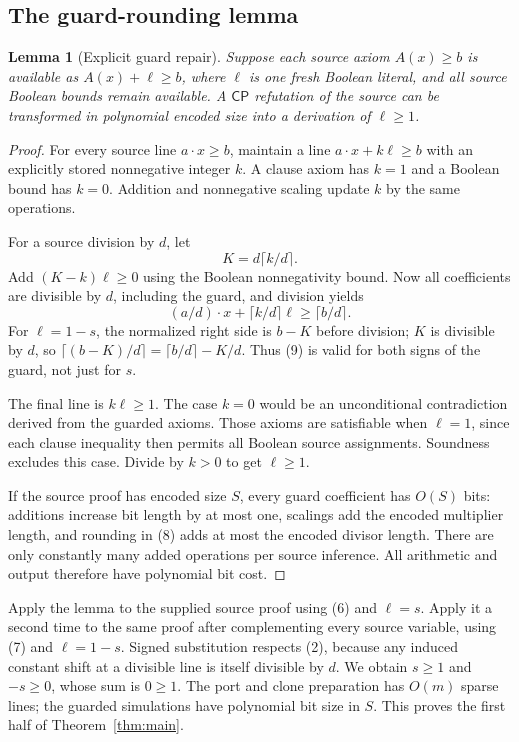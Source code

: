 \documentclass[11pt]{article}
\newtheorem{lemma}[theorem]{Lemma}
\newcommand{\CP}{\mathsf{CP}}
\begin{document}
\subsection{The guard-rounding lemma}
\begin{lemma}[Explicit guard repair]\label{lem:guard}
Suppose each source axiom $A(x)\ge b$ is available as $A(x)+\ell\ge b$,
where $\ell$ is one fresh Boolean literal, and all source Boolean bounds
remain available. A $\CP$ refutation of the source can be transformed in
polynomial encoded size into a derivation of $\ell\ge1$.
\end{lemma}
\begin{proof}
For every source line $a\cdot x\ge b$, maintain a line
$a\cdot x+k\ell\ge b$ with an explicitly stored nonnegative integer $k$.
A clause axiom has $k=1$ and a Boolean bound has $k=0$. Addition and
nonnegative scaling update $k$ by the same operations.

For a source division by $d$, let
\[
            K=d\lceil k/d\rceil.                                    \tag{8}
\]
Add $(K-k)\ell\ge0$ using the Boolean nonnegativity bound. Now all
coefficients are divisible by $d$, including the guard, and division yields
\[
        (a/d)\cdot x+\lceil k/d\rceil\ell\ge\lceil b/d\rceil.         \tag{9}
\]
For $\ell=1-s$, the normalized right side is $b-K$ before division;
$K$ is divisible by $d$, so
$\lceil(b-K)/d\rceil=\lceil b/d\rceil-K/d$. Thus (9) is valid for
both signs of the guard, not just for $s$.

The final line is $k\ell\ge1$. The case $k=0$ would be an unconditional
contradiction derived from the guarded axioms. Those axioms are satisfiable
when $\ell=1$, since each clause inequality then permits all Boolean source
assignments. Soundness excludes this case. Divide by $k>0$ to get
$\ell\ge1$.

If the source proof has encoded size $S$, every guard coefficient has
$O(S)$ bits: additions increase bit length by at most one, scalings add the
encoded multiplier length, and rounding in (8) adds at most the encoded
divisor length. There are only constantly many added operations per source
inference. All arithmetic and output therefore have polynomial bit cost.
\end{proof}

Apply the lemma to the supplied source proof using (6) and $\ell=s$.
Apply it a second time to the same proof after complementing every source
variable, using (7) and $\ell=1-s$. Signed substitution respects (2), because
any induced constant shift at a divisible line is itself divisible by $d$.
We obtain $s\ge1$ and $-s\ge0$, whose sum is $0\ge1$.
The port and clone preparation has $O(m)$ sparse lines; the guarded
simulations have polynomial bit size in $S$. This proves the first half of
Theorem~\ref{thm:main}.
\end{document}
